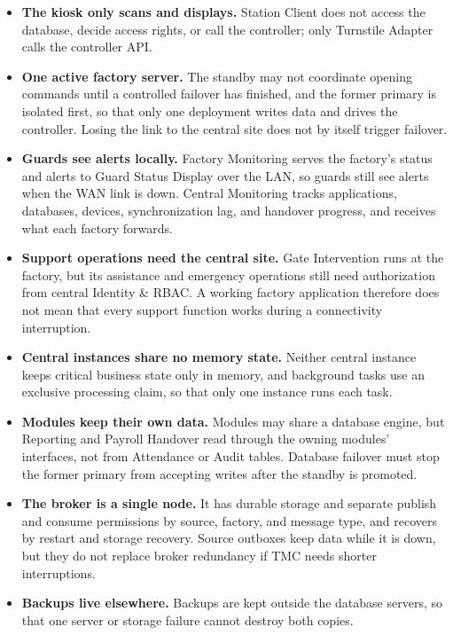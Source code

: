 \begin{itemize}[leftmargin=36pt, itemsep=2pt, topsep=4pt, parsep=2pt]
  \item \textbf{The kiosk only scans and displays.} Station Client does not access the database, decide access rights, or call the controller; only Turnstile Adapter calls the controller API.
  \item \textbf{One active factory server.} The standby may not coordinate opening commands until a controlled failover has finished, and the former primary is isolated first, so that only one deployment writes data and drives the controller. Losing the link to the central site does not by itself trigger failover.
  \item \textbf{Guards see alerts locally.} Factory Monitoring serves the factory's status and alerts to Guard Status Display over the LAN, so guards still see alerts when the WAN link is down. Central Monitoring tracks applications, databases, devices, synchronization lag, and handover progress, and receives what each factory forwards.
  \item \textbf{Support operations need the central site.} Gate Intervention runs at the factory, but its assistance and emergency operations still need authorization from central Identity \& RBAC. A working factory application therefore does not mean that every support function works during a connectivity interruption.
  \item \textbf{Central instances share no memory state.} Neither central instance keeps critical business state only in memory, and background tasks use an exclusive processing claim, so that only one instance runs each task.
  \item \textbf{Modules keep their own data.} Modules may share a database engine, but Reporting and Payroll Handover read through the owning modules' interfaces, not from Attendance or Audit tables. Database failover must stop the former primary from accepting writes after the standby is promoted.
  \item \textbf{The broker is a single node.} It has durable storage and separate publish and consume permissions by source, factory, and message type, and recovers by restart and storage recovery. Source outboxes keep data while it is down, but they do not replace broker redundancy if TMC needs shorter interruptions.
  \item \textbf{Backups live elsewhere.} Backups are kept outside the database servers, so that one server or storage failure cannot destroy both copies.
\end{itemize}

